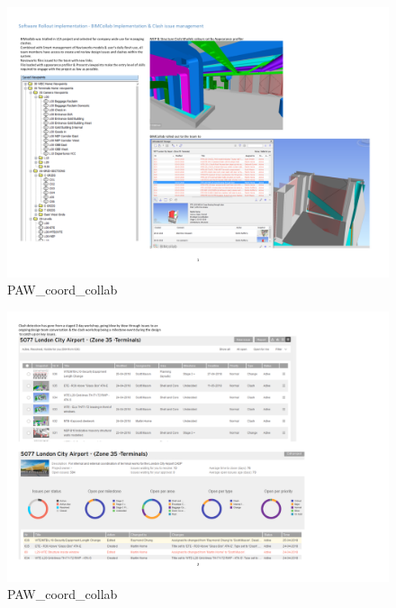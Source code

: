 \documentclass[
]{article}
\begin{document}
\begin{figure}[H]

{\centering \includegraphics{assets/PAW/P+W-BIMcollab-1.png}

}

\caption{PAW\_coord\_collab}

\end{figure}%
\begin{figure}[H]

{\centering \includegraphics{assets/PAW/P+W-BIMcollab-2.png}

}

\caption{PAW\_coord\_collab}

\end{figure}%
\end{document}
